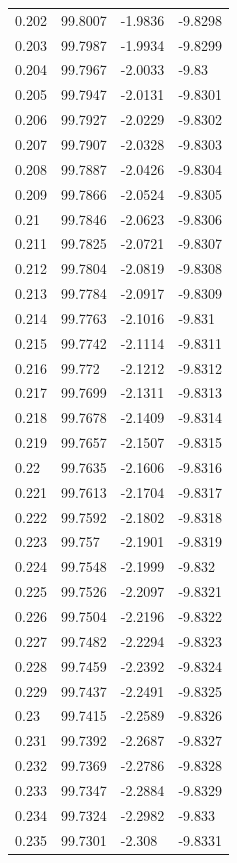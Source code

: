 \begin{tabular}{llll}
0.202 & 99.8007 & -1.9836 & -9.8298 \\
0.203 & 99.7987 & -1.9934 & -9.8299 \\
0.204 & 99.7967 & -2.0033 & -9.83 \\
0.205 & 99.7947 & -2.0131 & -9.8301 \\
0.206 & 99.7927 & -2.0229 & -9.8302 \\
0.207 & 99.7907 & -2.0328 & -9.8303 \\
0.208 & 99.7887 & -2.0426 & -9.8304 \\
0.209 & 99.7866 & -2.0524 & -9.8305 \\
0.21 & 99.7846 & -2.0623 & -9.8306 \\
0.211 & 99.7825 & -2.0721 & -9.8307 \\
0.212 & 99.7804 & -2.0819 & -9.8308 \\
0.213 & 99.7784 & -2.0917 & -9.8309 \\
0.214 & 99.7763 & -2.1016 & -9.831 \\
0.215 & 99.7742 & -2.1114 & -9.8311 \\
0.216 & 99.772 & -2.1212 & -9.8312 \\
0.217 & 99.7699 & -2.1311 & -9.8313 \\
0.218 & 99.7678 & -2.1409 & -9.8314 \\
0.219 & 99.7657 & -2.1507 & -9.8315 \\
0.22 & 99.7635 & -2.1606 & -9.8316 \\
0.221 & 99.7613 & -2.1704 & -9.8317 \\
0.222 & 99.7592 & -2.1802 & -9.8318 \\
0.223 & 99.757 & -2.1901 & -9.8319 \\
0.224 & 99.7548 & -2.1999 & -9.832 \\
0.225 & 99.7526 & -2.2097 & -9.8321 \\
0.226 & 99.7504 & -2.2196 & -9.8322 \\
0.227 & 99.7482 & -2.2294 & -9.8323 \\
0.228 & 99.7459 & -2.2392 & -9.8324 \\
0.229 & 99.7437 & -2.2491 & -9.8325 \\
0.23 & 99.7415 & -2.2589 & -9.8326 \\
0.231 & 99.7392 & -2.2687 & -9.8327 \\
0.232 & 99.7369 & -2.2786 & -9.8328 \\
0.233 & 99.7347 & -2.2884 & -9.8329 \\
0.234 & 99.7324 & -2.2982 & -9.833 \\
0.235 & 99.7301 & -2.308 & -9.8331 \\

\end{tabular}
